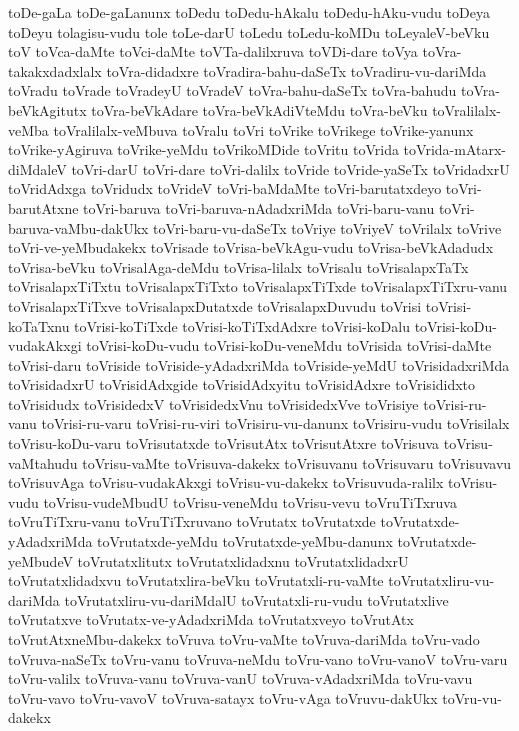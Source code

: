 {toDe-gaLa
toDe-gaLanunx
toDedu
toDedu-hAkalu
toDedu-hAku-vudu
toDeya
toDeyu
tolagisu-vudu
tole
toLe-darU
toLedu
toLedu-koMDu
toLeyaleV-beVku
toV
toVca-daMte
toVci-daMte
toVTa-dalilxruva
toVDi-dare
toVya
toVra-takakxdadxlalx
toVra-didadxre
toVradira-bahu-daSeTx
toVradiru-vu-dariMda
toVradu
toVrade
toVradeyU
toVradeV
toVra-bahu-daSeTx
toVra-bahudu
toVra-beVkAgitutx
toVra-beVkAdare
toVra-beVkAdiVteMdu
toVra-beVku
toVralilalx-veMba
toVralilalx-veMbuva
toVralu
toVri
toVrike
toVrikege
toVrike-yanunx
toVrike-yAgiruva
toVrike-yeMdu
toVrikoMDide
toVritu
toVrida
toVrida-mAtarx-diMdaleV
toVri-darU
toVri-dare
toVri-dalilx
toVride
toVride-yaSeTx
toVridadxrU
toVridAdxga
toVridudx
toVrideV
toVri-baMdaMte
toVri-barutatxdeyo
toVri-barutAtxne
toVri-baruva
toVri-baruva-nAdadxriMda
toVri-baru-vanu
toVri-baruva-vaMbu-dakUkx
toVri-baru-vu-daSeTx
toVriye
toVriyeV
toVrilalx
toVrive
toVri-ve-yeMbudakekx
toVrisade
toVrisa-beVkAgu-vudu
toVrisa-beVkAdadudx
toVrisa-beVku
toVrisalAga-deMdu
toVrisa-lilalx
toVrisalu
toVrisalapxTaTx
toVrisalapxTiTxtu
toVrisalapxTiTxto
toVrisalapxTiTxde
toVrisalapxTiTxru-vanu
toVrisalapxTiTxve
toVrisalapxDutatxde
toVrisalapxDuvudu
toVrisi
toVrisi-koTaTxnu
toVrisi-koTiTxde
toVrisi-koTiTxdAdxre
toVrisi-koDalu
toVrisi-koDu-vudakAkxgi
toVrisi-koDu-vudu
toVrisi-koDu-veneMdu
toVrisida
toVrisi-daMte
toVrisi-daru
toVriside
toVriside-yAdadxriMda
toVriside-yeMdU
toVrisidadxriMda
toVrisidadxrU
toVrisidAdxgide
toVrisidAdxyitu
toVrisidAdxre
toVrisididxto
toVrisidudx
toVrisidedxV
toVrisidedxVnu
toVrisidedxVve
toVrisiye
toVrisi-ru-vanu
toVrisi-ru-varu
toVrisi-ru-viri
toVrisiru-vu-danunx
toVrisiru-vudu
toVrisilalx
toVrisu-koDu-varu
toVrisutatxde
toVrisutAtx
toVrisutAtxre
toVrisuva
toVrisu-vaMtahudu
toVrisu-vaMte
toVrisuva-dakekx
toVrisuvanu
toVrisuvaru
toVrisuvavu
toVrisuvAga
toVrisu-vudakAkxgi
toVrisu-vu-dakekx
toVrisuvuda-ralilx
toVrisu-vudu
toVrisu-vudeMbudU
toVrisu-veneMdu
toVrisu-vevu
toVruTiTxruva
toVruTiTxru-vanu
toVruTiTxruvano
toVrutatx
toVrutatxde
toVrutatxde-yAdadxriMda
toVrutatxde-yeMdu
toVrutatxde-yeMbu-danunx
toVrutatxde-yeMbudeV
toVrutatxlitutx
toVrutatxlidadxnu
toVrutatxlidadxrU
toVrutatxlidadxvu
toVrutatxlira-beVku
toVrutatxli-ru-vaMte
toVrutatxliru-vu-dariMda
toVrutatxliru-vu-dariMdalU
toVrutatxli-ru-vudu
toVrutatxlive
toVrutatxve
toVrutatx-ve-yAdadxriMda
toVrutatxveyo
toVrutAtx
toVrutAtxneMbu-dakekx
toVruva
toVru-vaMte
toVruva-dariMda
toVru-vado
toVruva-naSeTx
toVru-vanu
toVruva-neMdu
toVru-vano
toVru-vanoV
toVru-varu
toVru-valilx
toVruva-vanu
toVruva-vanU
toVruva-vAdadxriMda
toVru-vavu
toVru-vavo
toVru-vavoV
toVruva-satayx
toVru-vAga
toVruvu-dakUkx
toVru-vu-dakekx
}
